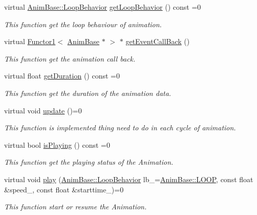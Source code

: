\begin{DoxyCompactItemize}
virtual \hyperlink{class_magnum_1_1_anim_base_ad6b3de9518d395df5ca9865f268ec581}{Anim\+Base\+::\+Loop\+Behavior} \hyperlink{class_magnum_1_1_anim_base_a8216c0d73667617346e4bad2d7be74bf}{get\+Loop\+Behavior} () const  =0
\begin{DoxyCompactList}\small\item\em This function get the loop behaviour of animation. \end{DoxyCompactList}\item 
virtual \hyperlink{class_magnum_1_1_functor1}{Functor1}$<$ \hyperlink{class_magnum_1_1_anim_base}{Anim\+Base} $\ast$ $>$ $\ast$ \hyperlink{class_magnum_1_1_anim_base_a6a88e915f45ecc7e081f2dec0cec00b9}{get\+Event\+Call\+Back} ()
\begin{DoxyCompactList}\small\item\em This function get the animation call back. \end{DoxyCompactList}\item 
virtual float \hyperlink{class_magnum_1_1_anim_base_aa9692d01a927dc7ac9a6f828e4c22e44}{get\+Duration} () const  =0
\begin{DoxyCompactList}\small\item\em This function get the duration of the animation data. \end{DoxyCompactList}\item 
virtual void \hyperlink{class_magnum_1_1_anim_base_aa4aff002b23918cb98640966689c7aa6}{update} ()=0
\begin{DoxyCompactList}\small\item\em This function is implemented thing need to do in each cycle of animation. \end{DoxyCompactList}\item 
virtual bool \hyperlink{class_magnum_1_1_anim_base_a8d6bf53ec9aa736036333bfa2b17574f}{is\+Playing} () const  =0
\begin{DoxyCompactList}\small\item\em This function get the playing status of the Animation. \end{DoxyCompactList}\item 
virtual void \hyperlink{class_magnum_1_1_anim_base_aa5b9f45b1fdae882c38edbfe92d1463c}{play} (\hyperlink{class_magnum_1_1_anim_base_ad6b3de9518d395df5ca9865f268ec581}{Anim\+Base\+::\+Loop\+Behavior} lb\+\_\+=\hyperlink{class_magnum_1_1_anim_base_ad6b3de9518d395df5ca9865f268ec581a8b877225f523af406db47b5a700d443f}{Anim\+Base\+::\+L\+O\+OP}, const float \&speed\+\_, const float \&starttime\+\_)=0
\begin{DoxyCompactList}\small\item\em This function start or resume the Animation. \end{DoxyCompactList}\item 

\end{DoxyCompactItemize}

